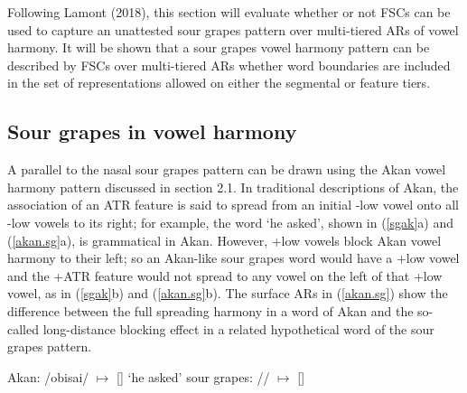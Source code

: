 \documentclass[,doc,floatsintext]{apa6}
\theoremstyle{definition}
\theoremstyle{definition}
\theoremstyle{definition}
\theoremstyle{remark}
\begin{document}
Following Lamont (2018), this section will evaluate whether or not FSCs
can be used to capture an unattested sour grapes pattern over
multi-tiered ARs of vowel harmony. It will be shown that a sour grapes
vowel harmony pattern can be described by FSCs over multi-tiered ARs
whether word boundaries are included in the set of representations
allowed on either the segmental or feature tiers.

\subsection{Sour grapes in vowel
harmony}\label{sour-grapes-in-vowel-harmony}

A parallel to the nasal sour grapes pattern can be drawn using the Akan
vowel harmony pattern discussed in section 2.1. In traditional
descriptions of Akan, the association of an ATR feature is said to
spread from an initial -low vowel onto all -low vowels to its right; for
example, the word \emph{} `he asked', shown in
(\ref{sgak}a) and (\ref{akan.sg}a), is grammatical in Akan. However,
+low vowels block Akan vowel harmony to their left; so an Akan-like sour
grapes word would have a +low vowel and the +ATR feature would not
spread to any vowel on the left of that +low vowel, as in (\ref{sgak}b)
and (\ref{akan.sg}b). The surface ARs in (\ref{akan.sg}) show the
difference between the full spreading harmony in a word of Akan and the
so-called long-distance blocking effect in a related hypothetical word
of the sour grapes pattern.

\begin{exe}
\label{sgak} 
\begin{xlist}
  \ex Akan: /obisai/ $\mapsto$ [] `he asked'
  \ex sour grapes: // $\mapsto$ []
\end{xlist}
\end{exe}\newpage
\end{document}
